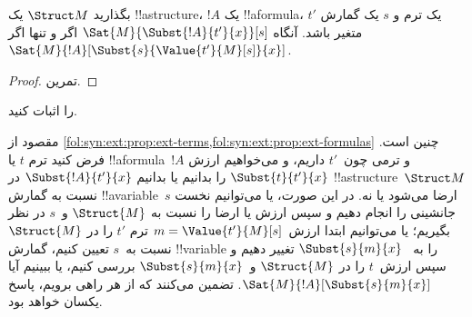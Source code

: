 \documentclass[../../../include/open-logic-section]{subfiles}
\begin{document}
\begin{prop} بگذارید $\Struct M$ یک
!!a{structure}، $!A$ یک !!a{formula}، $t'$ یک ترم و $s$ یک گمارش متغیر
باشد. آنگاه $\Sat{M}{\Subst{!A}{t'}{x}}[s]$ اگر و تنها اگر
$\Sat{M}{!A}[\Subst{s}{\Value{t'}{M}[s]}{x}]$.
\end{prop}

\begin{proof}
تمرین.
\end{proof}

\begin{prob}
 را اثبات کنید.
\end{prob}

\begin{explain}
  مقصود از
  \cref{fol:syn:ext:prop:ext-terms,fol:syn:ext:prop:ext-formulas} چنین است.
  فرض کنید ترم $t$ یا !!a{formula}~$!A$ و ترمی چون~$t'$ داریم، و می‌خواهیم
  ارزش $\Subst{t}{t'}{x}$ را بدانیم یا بدانیم
  $\Subst{!A}{t'}{x}$ در !!a{structure}~$\Struct M$ نسبت به گمارش
  !!a{variable}~$s$ ارضا می‌شود یا نه. در این صورت، یا می‌توانیم نخست
  جانشینی را انجام دهیم و سپس ارزش یا ارضا را نسبت به $\Struct{M}$ و~$s$
  در نظر بگیریم؛ یا می‌توانیم ابتدا ارزش~$m = \Value{t'}{M}[s]$ ترم $t'$
  را در $\Struct{M}$ نسبت به~$s$ تعیین کنیم، گمارش !!{variable} را به
  ~$\Subst{s}{m}{x}$ تغییر دهیم و سپس ارزش~$t$ را در $\Struct{M}$
  و~$\Subst{s}{m}{x}$ بررسی کنیم، یا ببینیم آیا
  $\Sat{M}{!A}[\Subst{s}{m}{x}]$.
  تضمین می‌کنند که از هر راهی برویم، پاسخ یکسان خواهد بود.
\end{explain}
\end{document}

